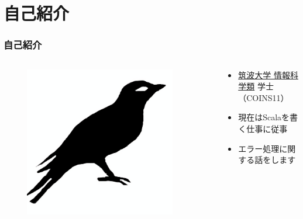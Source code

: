 





\newcommand\ballref[1]{%
\tikz \node[circle, shade,ball color=structure.fg,inner sep=0pt,%
  text width=8pt,font=\tiny,align=center] {\color{white}\ref{#1}};
}




\frame{\maketitle}

\section{自己紹介}
\begin{frame}[fragile]
  \frametitle{自己紹介}
  
  \begin{columns}
    \begin{column}{0.4\textwidth}
      \centering
      \begin{figure}
        \includegraphics[width=0.9\textwidth]{img/bird2x.png}
      \end{figure}
    \end{column}
    \begin{column}{0.6\textwidth}
      \begin{itemize}
        \item<2-> \href{https://www.coins.tsukuba.ac.jp/}{筑波大学 情報科学類} 学士（COINS11）
        \item<3-> 現在はScalaを書く仕事に従事
        \item<4-> エラー処理に関する話をします
      \end{itemize}
    \end{column}
  \end{columns}
\end{frame}

